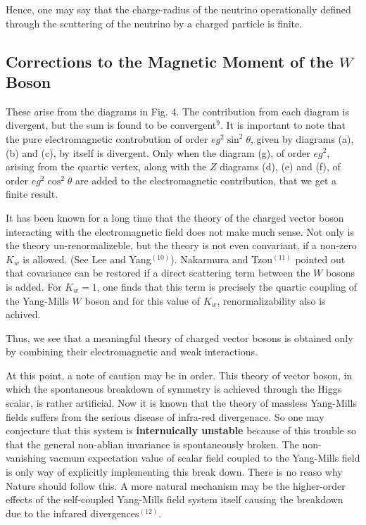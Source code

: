 Hence, one may say that the charge-radius of the neutrino operationally defined through the scuttering of the neutrino by a charged particle is finite.

\newpage

\subsection*{Corrections to the Magnetic Moment of the $W$ Boson}

These arise from the diagrams in Fig. 4. The contribution from each diagram is divergent, but the sum is found to be convergent$^{9}$. It is important to note that the pure electromagnetic controbution of order $eg^{2} \sin^{2} \theta$, given by diagrams (a), (b) and (c), by itself is divergent. Only when the diagram (g), of order $eg^{2}$, arising from the quartic vertex, along with the $Z$ diagrams (d), (e) and (f), of order $eg^{2} \cos^{2} \theta$ are added to the electromagnetic contribution, that we get a finite result.

It has been known for a long time that the theory of the charged vector boson interacting with the electromagnetic field does not make much sense. Not only is the theory un-renormalizeble, but the theory is not even convariant, if a non-zero $K_{w}$ is allowed. (See Lee  and Yang$^{(10)}$). Nakarmura and Tzou$^{(11)}$ pointed out that covariance can be restored if a direct scattering term between  the $W$ bosons is added. For $K_{w}=1$, one finds that this term is precisely the quartic coupling of the Yang-Mills $W$  boson and for this value of $K_{w}$, renormalizability also is achived.

Thus, we see that a meaningful theory of charged vector bosons is obtained only by combining their electromagnetic and weak interactions.

At this point, a note of caution may be in order. This theory of vector boson, in which the spontaneous breakdown of symmetry is achieved through the Higgs scalar, is rather artificial. Now it is known that the theory of massless Yang-Mills fields suffers from the serious disease of infra-red divergenace. So one may conjecture that this system is \textbf{internuically unstable} because of this trouble so that the general non-ablian invariance is spontaneously broken. The non-vanishing vacmum expectation value of scalar field coupled to the Yang-Mills field is only way of explicitly implementing this break down. There is no reaso why Nature should follow this. A more natural mechanism may be the higher-order effects of the self-coupled Yang-Mills field system itself causing the breakdown due to the infrared divergences$^{(12)}$.

